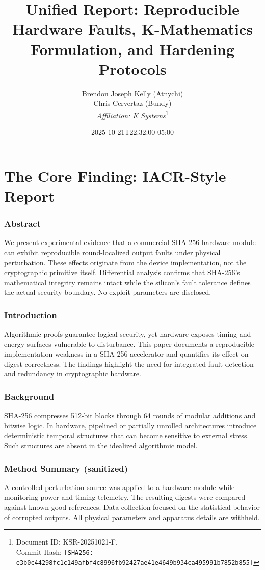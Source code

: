 \documentclass[11pt, a4paper]{article}
\title{Unified Report: Reproducible Hardware Faults, K-Mathematics Formulation, and Hardening Protocols}
\author{Brendon Joseph Kelly (Atnychi) \\ Chris Cervertaz (Bundy) \\ \textit{Affiliation: K Systems}\thanks{Document ID: KSR-20251021-F.\\Commit Hash: \texttt{[SHA256: e3b0c44298fc1c149afbf4c8996fb92427ae41e4649b934ca495991b7852b855]}}}
\date{2025-10-21T22:32:00-05:00}
\begin{document}
\maketitle
\pagestyle{headings}
\tableofcontents
\newpage

\part{The Core Finding: IACR-Style Report}
\label{part:core_finding}

\section{Abstract}
We present experimental evidence that a commercial SHA-256 hardware module can exhibit reproducible round-localized output faults under physical perturbation. These effects originate from the device implementation, not the cryptographic primitive itself. Differential analysis confirms that SHA-256's mathematical integrity remains intact while the silicon's fault tolerance defines the actual security boundary. No exploit parameters are disclosed.

\section{Introduction}
Algorithmic proofs guarantee logical security, yet hardware exposes timing and energy surfaces vulnerable to disturbance. This paper documents a reproducible implementation weakness in a SHA-256 accelerator and quantifies its effect on digest correctness. The findings highlight the need for integrated fault detection and redundancy in cryptographic hardware.

\section{Background}
SHA-256 compresses 512-bit blocks through 64 rounds of modular additions and bitwise logic. In hardware, pipelined or partially unrolled architectures introduce deterministic temporal structures that can become sensitive to external stress. Such structures are absent in the idealized algorithmic model.

\section{Method Summary (sanitized)}
A controlled perturbation source was applied to a hardware module while monitoring power and timing telemetry. The resulting digests were compared against known-good references. Data collection focused on the statistical behavior of corrupted outputs. All physical parameters and apparatus details are withheld.
\end{document}
